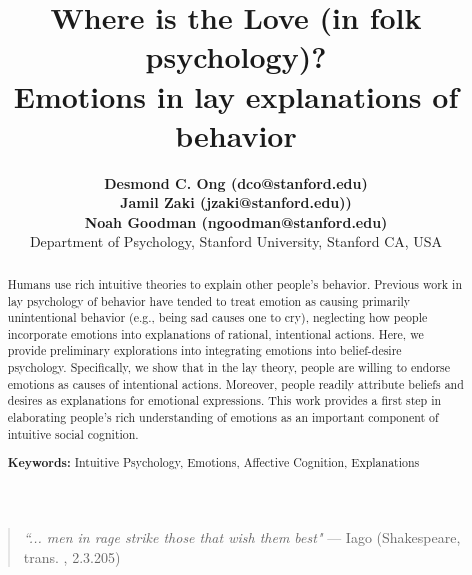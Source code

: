\documentclass[10pt,letterpaper]{article}
\title{ Where is the Love (in folk psychology)? \\ Emotions in lay explanations of behavior \ndg{the cute part is a stretch... how about just the second part?}}
\author{{\large \bf Desmond C. Ong (dco@stanford.edu)} \\
{\large \bf Jamil Zaki (jzaki@stanford.edu))} \\
{\large \bf Noah Goodman (ngoodman@stanford.edu)} \\
  Department of Psychology, Stanford University, Stanford CA, USA 
}
\newcommand{\red}[1]{\textcolor{Red}{#1}}
\newcommand{\ndg}[1]{\textcolor{Green}{[ndg: #1]}}
\begin{document}
\maketitle

\begin{abstract}
Humans use rich intuitive theories to explain other people's behavior. Previous work in lay psychology of behavior have tended to treat emotion as causing primarily unintentional behavior (e.g., being sad causes one to cry), neglecting how people incorporate emotions into explanations of rational, intentional actions. Here, we provide preliminary explorations into integrating emotions into belief-desire psychology. Specifically, we show that in the lay theory, people are willing to endorse emotions as causes of intentional actions. Moreover, people readily attribute beliefs and desires as explanations for emotional expressions. This work provides a first step in elaborating people's rich understanding of emotions as an important component of intuitive social cognition.

\textbf{Keywords:} 
Intuitive Psychology, Emotions, Affective Cognition, Explanations
\end{abstract}








\begin{quote}
\textit{``... men in rage strike those that wish them best"} 
--- Iago (Shakespeare, trans. , 2.3.205) %
\end{quote}



\end{document}
